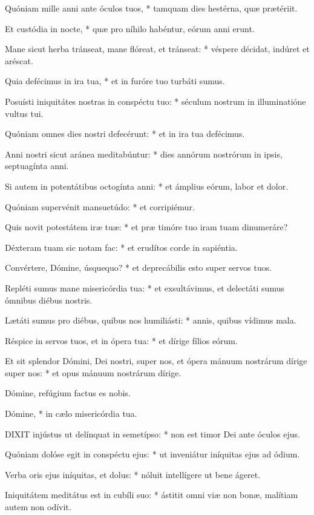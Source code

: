 Quóniam mille anni ante óculos tuos, * tamquam dies hestérna, quæ prætériit.

Et custódia in nocte, * quæ pro níhilo habéntur, eórum anni erunt.

Mane sicut herba tránseat, mane flóreat, et tránseat: * véspere décidat, indúret et aréscat.

Quia defécimus in ira tua, * et in furóre tuo turbáti sumus.

Posuísti iniquitátes nostras in conspéctu tuo: * séculum nostrum in illuminatióne vultus tui.

Quóniam omnes dies nostri defecérunt: * et in ira tua defécimus.

Anni nostri sicut aránea meditabúntur: * dies annórum nostrórum in ipsis, septuagínta anni.

Si autem in potentátibus octogínta anni: * et ámplius eórum, labor et dolor.

Quóniam supervénit mansuetúdo: * et corripiémur.

Quis novit potestátem iræ tuæ: * et præ timóre tuo iram tuam dinumeráre?

Déxteram tuam sic notam fac: * et erudítos corde in sapiéntia.

Convértere, Dómine, úsquequo? * et deprecábilis esto super servos tuos.

Repléti sumus mane misericórdia tua: * et exsultávimus, et delectáti sumus ómnibus diébus nostris.

Lætáti sumus pro diébus, quibus nos humiliásti: * annis, quibus vídimus mala.

Réspice in servos tuos, et in ópera tua: * et dírige fílios eórum.

Et sit splendor Dómini, Dei nostri, super nos, et ópera mánuum nostrárum dírige super nos: * et opus mánuum nostrárum dírige.

 Dómine, refúgium factus es nobis.

 Dómine, * in cælo misericórdia tua.


\lettrine[lines=2]{D}{IXIT} injústus ut delínquat in semetípso: * non est timor Dei ante óculos ejus.

Quóniam dolóse egit in conspéctu ejus: * ut inveniátur iníquitas ejus ad ódium.

Verba oris ejus iníquitas, et dolus: * nóluit intellígere ut bene ágeret.

Iniquitátem meditátus est in cubíli suo: * ástitit omni viæ non bonæ, malítiam autem non odívit.

